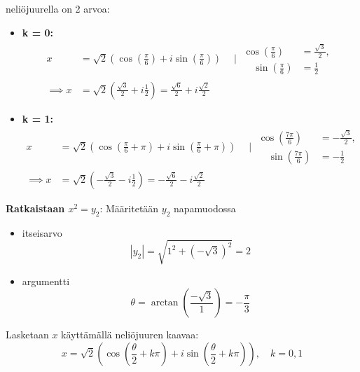 \documentclass{article}
\begin{document}
\begin{itemize}
    \pagebreak
    neliöjuurella on 2 arvoa:
    \begin{itemize}
        \item \textbf{k = 0:}
        \[
        \begin{aligned}            
            x &= \sqrt{2} \left( \cos\left( \frac{\pi}{6} \right) + i \sin\left( \frac{\pi}{6} \right) \right) \quad \mid
            \begin{aligned}
                \cos\left( \frac{\pi}{6} \right) &= \frac{\sqrt{3}}{2},\\ \quad \sin\left( \frac{\pi}{6} \right) &= \frac{1}{2}
            \end{aligned}\\
            \implies 
            x &= \sqrt{2} \left( \frac{\sqrt{3}}{2} + i \frac{1}{2} \right) = \frac{\sqrt{6}}{2} + i \frac{\sqrt{2}}{2}
        \end{aligned}
        \]
        \item \textbf{k = 1:}
        \[
        \begin{aligned}
            x &= \sqrt{2} \left( \cos\left( \frac{\pi}{6} + \pi \right) + i \sin\left( \frac{\pi}{6} + \pi \right) \right) \quad \mid
            \begin{aligned}
                \cos\left( \frac{7\pi}{6} \right) &= -\frac{\sqrt{3}}{2},\\ \quad \sin\left( \frac{7\pi}{6} \right) &= -\frac{1}{2}
            \end{aligned} \\
            \implies
            x &= \sqrt{2} \left( -\frac{\sqrt{3}}{2} - i \frac{1}{2} \right) = -\frac{\sqrt{6}}{2} - i \frac{\sqrt{2}}{2}
        \end{aligned}
        \]
    \end{itemize}

    \textbf{Ratkaistaan $x^2 = y_2$}:\newline
    Määritetään $y_2$ napamuodossa\newline
    \begin{itemize}
        \item itseisarvo
        \[
            |y_2| = \sqrt{1^2 + (-\sqrt{3})^2} = 2
        \]
        \item argumentti
        \[
            \theta = \arctan\left( \frac{-\sqrt{3}}{1} \right) = -\frac{\pi}{3}
        \]
    \end{itemize}
    \pagebreak
    Lasketaan $x$ käyttämällä neliöjuuren kaavaa:
    \[
        x = \sqrt{2} \left( \cos\left( \frac{\theta}{2} + k\pi \right) + i \sin\left( \frac{\theta}{2} + k\pi \right) \right), \quad k = 0, 1
    \]




\end{itemize}
\end{document}
